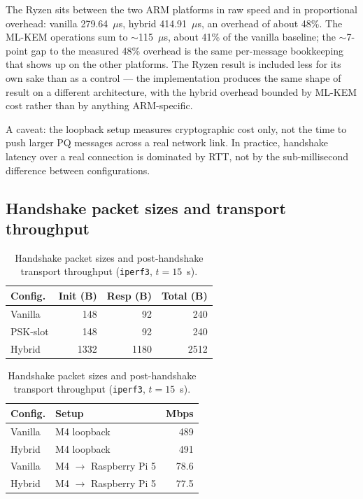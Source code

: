 \documentclass[11pt,a4paper]{article}
\begin{document}
The Ryzen sits between the two ARM platforms in raw speed and in proportional overhead: vanilla 279.64~$\mu$s, hybrid 414.91~$\mu$s, an overhead of about 48\%. The ML-KEM operations sum to $\sim$115~$\mu$s, about 41\% of the vanilla baseline; the $\sim$7-point gap to the measured 48\% overhead is the same per-message bookkeeping that shows up on the other platforms. The Ryzen result is included less for its own sake than as a control --- the implementation produces the same shape of result on a different architecture, with the hybrid overhead bounded by ML-KEM cost rather than by anything ARM-specific.

A caveat: the loopback setup measures cryptographic cost only, not the time to push larger PQ messages across a real network link. In practice, handshake latency over a real connection is dominated by RTT, not by the sub-millisecond difference between configurations.

\subsection{Handshake packet sizes and transport throughput}

\begin{table}[H]
\centering
\caption{Handshake packet sizes and post-handshake transport throughput (\texttt{iperf3}, $t=15$~s).}
\label{tab:size_and_throughput}
\begin{minipage}[t]{0.42\textwidth}\centering
\small\setlength{\tabcolsep}{4pt}
\begin{tabular}{@{}lrrr@{}}
\toprule
\textbf{Config.} & \textbf{Init (B)} & \textbf{Resp (B)} & \textbf{Total (B)} \\
\midrule
Vanilla   & 148   & 92    & 240 \\
PSK-slot  & 148   & 92    & 240 \\
Hybrid    & 1332  & 1180  & 2512 \\
\bottomrule
\end{tabular}
\end{minipage}\hfill
\begin{minipage}[t]{0.55\textwidth}\centering
\small\setlength{\tabcolsep}{4pt}
\begin{tabular}{@{}llr@{}}
\toprule
\textbf{Config.} & \textbf{Setup} & \textbf{Mbps} \\
\midrule
Vanilla & M4 loopback                     & 489 \\
Hybrid  & M4 loopback                     & 491 \\
Vanilla & M4 $\rightarrow$ Raspberry Pi 5 & 78.6 \\
Hybrid  & M4 $\rightarrow$ Raspberry Pi 5 & 77.5 \\
\bottomrule
\end{tabular}
\end{minipage}
\end{table}
\end{document}
